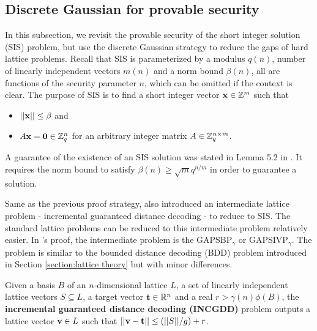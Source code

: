 \documentclass[../main.tex]{subfiles}
\begin{document}

\subsection{Discrete Gaussian for provable security}

In this subsection, we revisit the provable security of the short integer solution (SIS) problem, but use the discrete Gaussian strategy to reduce the gaps of hard lattice problems. 
Recall that SIS is parameterized by a modulus $q(n)$, number of linearly independent vectors $m(n)$ and a norm bound $\beta(n)$, all are functions of the security parameter $n$, which can be omitted if the context is clear. The purpose of SIS is to find a short integer vector $\mathbf{x} \in \mathbb{Z}^m$ such that 
\begin{itemize}
    \item $||\mathbf{x}|| \le \beta$ and 
    \item $A \mathbf{x} =\mathbf{0} \in \mathbb{Z}_q^n$ for an arbitrary integer matrix $A \in \mathbb{Z}_q^{n \times m}$.
\end{itemize}
A guarantee of the existence of an SIS solution was stated in Lemma 5.2 in \citep{micciancio07worst}. It requires the norm bound to satisfy $\beta(n) \ge \sqrt{m} q^{n/m}$ in order to guarantee a solution. 

Same as the previous proof strategy, \citet{micciancio07worst} also introduced an intermediate lattice problem - incremental guaranteed distance decoding - to reduce to SIS. The standard lattice problems can be reduced to this intermediate problem relatively easier. In \citet{ajtai1996generating}'s proof, the intermediate problem is the GAPSBP$_{\gamma}$ or GAPSIVP$_{\gamma}$. The problem is similar to the bounded distance decoding (BDD) problem introduced in Section \ref{section:lattice theory} but with minor differences. 

\begin{definition}
\label{def:incgdd}
Given a basis $B$ of an $n$-dimensional lattice $L$, a set of linearly independent lattice vectors $S \subseteq L$, a target vector $\mathbf{t} \in \mathbb{R}^n$ and a real $r > \gamma(n) \phi(B)$, the \textbf{incremental guaranteed distance decoding (INCGDD)} problem outputs a lattice vector $\mathbf{v} \in L$ such that $||\mathbf{v}-\mathbf{t}|| \le (||S||/g)+r$.
\end{definition}
\end{document}
